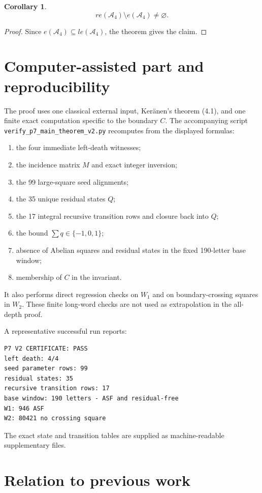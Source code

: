 \documentclass[11pt]{article}
\newtheorem{corollary}[theorem]{Corollary}
\theoremstyle{definition}
\newcommand{\A}{\mathcal A_4}
\newcommand{\code}[1]{\texttt{#1}}
\begin{document}
\begin{corollary}
\[
re(\A)\setminus e(\A)\ne\varnothing.
\]
\end{corollary}

\begin{proof}
Since $e(\A)\subseteq le(\A)$, the theorem gives the claim.
\end{proof}

\section{Computer-assisted part and reproducibility}

The proof uses one classical external input, Ker\"anen's theorem (4.1), and one finite exact computation specific to the boundary $C$. The accompanying script \code{verify\_p7\_main\_theorem\_v2.py} recomputes from the displayed formulas:
\begin{enumerate}
\item the four immediate left-death witnesses;
\item the incidence matrix $M$ and exact integer inversion;
\item the 99 large-square seed alignments;
\item the 35 unique residual states $Q$;
\item the 17 integral recursive transition rows and closure back into $Q$;
\item the bound $\sum q\in\{-1,0,1\}$;
\item absence of Abelian squares and residual states in the fixed 190-letter base window;
\item membership of $C$ in the invariant.
\end{enumerate}
It also performs direct regression checks on $W_1$ and on boundary-crossing squares in $W_2$. These finite long-word checks are not used as extrapolation in the all-depth proof.

A representative successful run reports:
\begin{verbatim}
P7 V2 CERTIFICATE: PASS
left death: 4/4
seed parameter rows: 99
residual states: 35
recursive transition rows: 17
base window: 190 letters - ASF and residual-free
W1: 946 ASF
W2: 80421 no crossing square
\end{verbatim}
The exact state and transition tables are supplied as machine-readable supplementary files.

\section{Relation to previous work}
\end{document}
